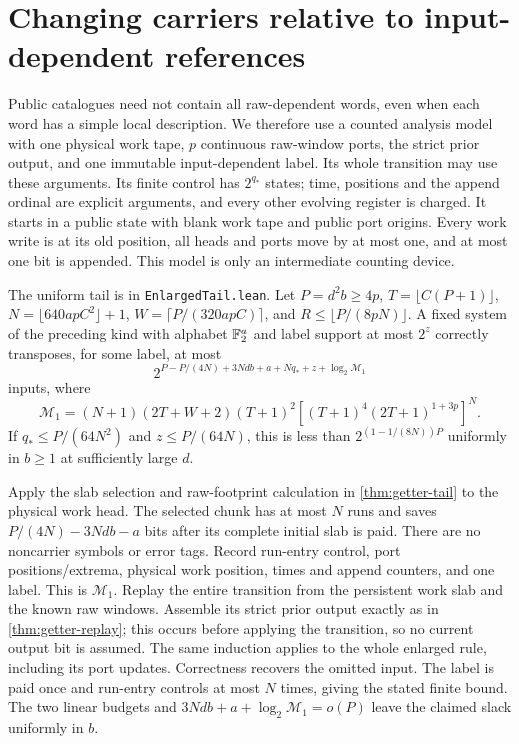 \section{Changing carriers relative to input-dependent references}\label{sec:references}

Public catalogues need not contain all raw-dependent words, even when each
word has a simple local description. We therefore use a counted analysis
model with one physical work tape, $p$ continuous raw-window ports, the
strict prior output, and one immutable input-dependent label. Its whole
transition may use these arguments. Its finite control has $2^{q_*}$ states;
time, positions and the append ordinal are explicit arguments, and every
other evolving register is charged. It starts in a public state with blank
work tape and public port origins. Every work write is at its old position,
all heads and ports move by at most one, and at most one bit is appended.
This model is only an intermediate counting device.

\begin{lemma}\label{lem:multiport-transition}
The uniform tail is  in
\texttt{EnlargedTail.lean}.
Let $P=d^2b\ge4p$, $T=\lfloor C(P+1)\rfloor$,
$N=\lfloor640apC^2\rfloor+1$, $W=\lceil P/(320apC)\rceil$, and
$R\le\lfloor P/(8pN)\rfloor$. A fixed system of the preceding kind with
alphabet $\mathbb{F}_2^a$ and label support at most $2^z$ correctly transposes, for
some label, at most
\[
 2^{P-P/(4N)+3Ndb+a+Nq_*+z+\log_2\mathcal M_1}
\]
inputs, where
\[
 \mathcal M_1=(N+1)(2T+W+2)(T+1)^2
       [(T+1)^4(2T+1)^{1+3p}]^N.
\]
If $q_*\le P/(64N^2)$ and $z\le P/(64N)$, this is less than
$2^{(1-1/(8N))P}$ uniformly in $b\ge1$ at sufficiently large $d$.
\end{lemma}
\begin{outline}
Apply the slab selection and raw-footprint calculation in
\cref{thm:getter-tail} to the physical work head. The selected chunk
has at most $N$ runs and saves $P/(4N)-3Ndb-a$ bits after its complete
initial slab is paid. There are no noncarrier symbols or error tags.
Record run-entry control, port positions/extrema, physical work position,
times and append counters, and one label. This is $\mathcal M_1$.
Replay the entire transition from the persistent work slab and the known
raw windows. Assemble its strict prior output exactly as in
\cref{thm:getter-replay}; this occurs before applying the transition, so
no current output bit is assumed. The same induction applies to the
whole enlarged rule, including its port updates. Correctness recovers the
omitted input. The label is paid once and run-entry controls at most $N$
times, giving the stated finite bound. The two linear budgets and
$3Ndb+a+\log_2\mathcal M_1=o(P)$ leave the claimed slack uniformly in $b$.
\end{outline}

